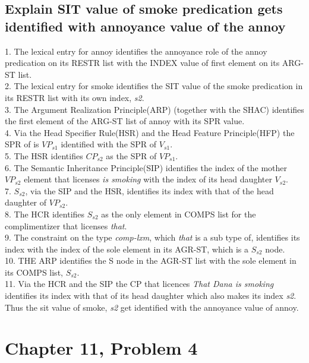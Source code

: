 \documentclass{article}
\begin{document}
\subsection{Explain SIT value of smoke predication gets identified with annoyance value of the annoy}
1. The lexical entry for annoy identifies the annoyance role of the annoy predication on its RESTR list with the INDEX value of first element on its ARG-ST list. \\
2. The lexical entry for smoke identifies the SIT value of the smoke predication in its RESTR list with its own index, {\it s2}.\\
3. The Argument Realization Principle(ARP) (together with the SHAC) identifies the first element of the ARG-ST list of annoy with its SPR value.\\
4. Via the Head Specifier Rule(HSR) and the Head Feature Principle(HFP) the SPR of is $VP_{s1}$ identified with the SPR of $V_{s1}$.\\
5. The HSR identifies $CP_{s2}$ as the SPR of $VP_{s1}$.\\
6. The Semantic Inheritance Principle(SIP) identifies the index of the mother $VP_{s2}$ element that licenses {\it is smoking} with the index of its head daughter $V_{s2}$. \\
7. $S_{s2}$, via the SIP and the HSR, identifies its index with that of the head daughter of $VP_{s2}$. \\
8. The HCR identifies $S_{s2}$ as the only element in COMPS list for the complimentizer that licenses {\it that}. \\
9. The constraint on the type {\it comp-lxm}, which {\it that} is a sub type of, identifies its index with the index of the sole element in its AGR-ST, which is a $S_{s2}$ node. \\
10. THE ARP identifies the S node in the AGR-ST list with the sole element in its COMPS list, $S_{s2}$. \\
11. Via the HCR and the SIP the CP that licences {\it That Dana is smoking} identifies its index with that of its head daughter which also makes its index {\it s2}. Thus the sit value of smoke, {\it s2} get identified with the annoyance value of annoy.
\section{Chapter 11, Problem 4}
\end{document}
